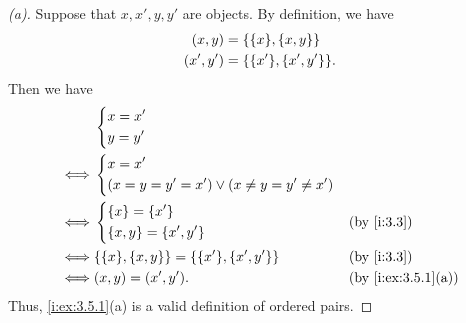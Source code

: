 \begin{proof}[(a)]
  Suppose that \(x, x', y, y'\) are objects.
  By definition, we have
  \begin{align*}
    (x, y)   & = \set{\set{x}, \set{x, y}}     \\
    (x', y') & = \set{\set{x'}, \set{x', y'}}.
  \end{align*}
  Then we have
  \begin{align*}
         & \begin{dcases}
             x = x' \\
             y = y'
           \end{dcases}                                                                    \\
    \iff & \begin{dcases}
             x = x' \\
             \pa{x = y = y' = x'} \lor \pa{x \neq y = y' \neq x'}
           \end{dcases}                              \\
    \iff & \begin{dcases}
             \set{x} = \set{x'} \\
             \set{x, y} = \set{x', y'}
           \end{dcases}                                &  & \by{i:3.3}                      \\
    \iff & \set{\set{x}, \set{x, y}} = \set{\set{x'}, \set{x', y'}} &  & \by{i:3.3}         \\
    \iff & (x, y) = (x', y').                                       &  & \by{i:ex:3.5.1}[a]
  \end{align*}
  Thus, \cref{i:ex:3.5.1}(a) is a valid definition of ordered pairs.
\end{proof}

